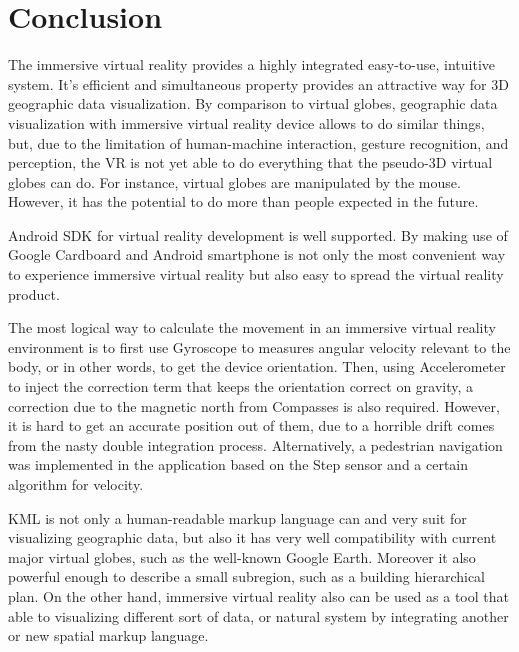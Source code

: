 \label{chapter-conclusion}
\chapter{Conclusion}

The immersive virtual reality provides a highly integrated easy-to-use, intuitive system. It's efficient and simultaneous property provides an attractive way for 3D geographic data visualization. By comparison to virtual globes, geographic data visualization with immersive virtual reality device allows to do similar things, but, due to the limitation of human-machine interaction, gesture recognition, and perception, the VR is not yet able to do everything that the pseudo-3D virtual globes can do. For instance, virtual globes are manipulated by the mouse. However, it has the potential to do more than people expected in the future.

Android SDK for virtual reality development is well supported. By making use of Google Cardboard and Android smartphone is not only the most convenient way to experience immersive virtual reality but also easy to spread the virtual reality product. 

The most logical way to calculate the movement in an immersive virtual reality environment is to first use Gyroscope to measures angular velocity relevant to the body, or in other words, to get the device orientation. Then, using Accelerometer to inject the correction term that keeps the orientation correct on gravity, a correction due to the magnetic north from Compasses is also required. However, it is hard to get an accurate position out of them, due to a horrible drift comes from the nasty double integration process. Alternatively, a pedestrian navigation was implemented in the application based on the Step sensor and a certain algorithm for velocity.

KML is not only a human-readable markup language can and very suit for visualizing geographic data, but also it has very well compatibility with current major virtual globes, such as the well-known Google Earth. Moreover it also powerful enough to describe a small subregion, such as a building hierarchical plan. On the other hand, immersive virtual reality also can be used as a tool that able to visualizing different sort of data, or natural system by integrating another or new spatial markup language.


